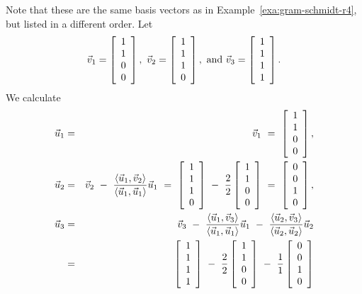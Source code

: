 \documentclass{ximera}
\begin{document}
\begin{solution}
  Note that these are the same basis vectors as in
  Example~\ref{exa:gram-schmidt-r4}, but listed in a different order.
  Let
  \begin{equation*}
    \vect{v}_1 = \startmat{c} 1 \\ 1 \\ 0 \\ 0 \stopmat,\quad
    \vect{v}_2 = \startmat{c} 1 \\ 1 \\ 1 \\ 0 \stopmat,\quad\mbox{and}\quad
    \vect{v}_3 = \startmat{c} 1 \\ 1 \\ 1 \\ 1 \stopmat.
  \end{equation*}
  We calculate
  \begin{eqnarray*}
    \vect{u}_1
    &=& \vect{v}_1
        ~=~ \startmat{c} 1 \\ 1 \\ 0 \\ 0 \stopmat,
    \\
    \vect{u}_2
    &=& \vect{v}_2 ~-~ \frac{\iprod{\vect{u}_1,\vect{v}_2}}{\iprod{\vect{u}_1,\vect{u}_1}}\vect{u}_1
    ~=~ \startmat{c} 1 \\ 1 \\ 1 \\ 0 \stopmat
    ~-~ \frac{2}{2}\startmat{c} 1 \\ 1 \\ 0 \\ 0 \stopmat
    ~=~ \startmat{c} 0 \\ 0 \\ 1 \\ 0 \stopmat,
    \\
    \vect{u}_3
    &=& \vect{v}_3
        ~-~ \frac{\iprod{\vect{u}_1,\vect{v}_3}}{\iprod{\vect{u}_1,\vect{u}_1}}\vect{u}_1
        ~-~ \frac{\iprod{\vect{u}_2,\vect{v}_3}}{\iprod{\vect{u}_2,\vect{u}_2}}\vect{u}_2
    \\
    &=& \startmat{c} 1 \\ 1 \\ 1 \\ 1 \stopmat
    ~-~ \frac{2}{2}\startmat{c} 1 \\ 1 \\ 0 \\ 0 \stopmat
    ~-~ \frac{1}{1}\startmat{c} 0 \\ 0 \\ 1 \\ 0 \stopmat

\end{eqnarray*}
\end{solution}
\end{document}
